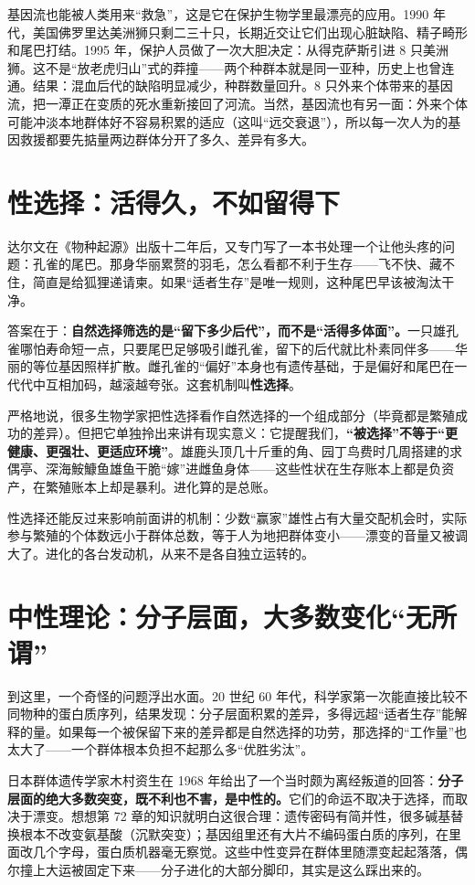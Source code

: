 基因流也能被人类用来“救急”，这是它在保护生物学里最漂亮的应用。1990 年代，美国佛罗里达美洲狮只剩二三十只，长期近交让它们出现心脏缺陷、精子畸形和尾巴打结。1995 年，保护人员做了一次大胆决定：从得克萨斯引进 8 只美洲狮。这不是“放老虎归山”式的莽撞——两个种群本就是同一亚种，历史上也曾连通。结果：混血后代的缺陷明显减少，种群数量回升。8 只外来个体带来的基因流，把一潭正在变质的死水重新接回了河流。当然，基因流也有另一面：外来个体可能冲淡本地群体好不容易积累的适应（这叫“远交衰退”），所以每一次人为的基因救援都要先掂量两边群体分开了多久、差异有多大。

\section{性选择：活得久，不如留得下}

达尔文在《物种起源》出版十二年后，又专门写了一本书处理一个让他头疼的问题：孔雀的尾巴。那身华丽累赘的羽毛，怎么看都不利于生存——飞不快、藏不住，简直是给狐狸递请柬。如果“适者生存”是唯一规则，这种尾巴早该被淘汰干净。

答案在于：\textbf{自然选择筛选的是“留下多少后代”，而不是“活得多体面”。}一只雄孔雀哪怕寿命短一点，只要尾巴足够吸引雌孔雀，留下的后代就比朴素同伴多——华丽的等位基因照样扩散。雌孔雀的“偏好”本身也有遗传基础，于是偏好和尾巴在一代代中互相加码，越滚越夸张。这套机制叫\textbf{性选择}。

严格地说，很多生物学家把性选择看作自然选择的一个组成部分（毕竟都是繁殖成功的差异）。但把它单独拎出来讲有现实意义：它提醒我们，\textbf{“被选择”不等于“更健康、更强壮、更适应环境”}。雄鹿头顶几十斤重的角、园丁鸟费时几周搭建的求偶亭、深海鮟鱇鱼雄鱼干脆“嫁”进雌鱼身体——这些性状在生存账本上都是负资产，在繁殖账本上却是暴利。进化算的是总账。

性选择还能反过来影响前面讲的机制：少数“赢家”雄性占有大量交配机会时，实际参与繁殖的个体数远小于群体总数，等于人为地把群体变小——漂变的音量又被调大了。进化的各台发动机，从来不是各自独立运转的。

\section{中性理论：分子层面，大多数变化“无所谓”}

到这里，一个奇怪的问题浮出水面。20 世纪 60 年代，科学家第一次能直接比较不同物种的蛋白质序列，结果发现：分子层面积累的差异，多得远超“适者生存”能解释的量。如果每一个被保留下来的差异都是自然选择的功劳，那选择的“工作量”也太大了——一个群体根本负担不起那么多“优胜劣汰”。

日本群体遗传学家木村资生在 1968 年给出了一个当时颇为离经叛道的回答：\textbf{分子层面的绝大多数突变，既不利也不害，是中性的。}它们的命运不取决于选择，而取决于漂变。想想第 72 章的知识就明白这很合理：遗传密码有简并性，很多碱基替换根本不改变氨基酸（沉默突变）；基因组里还有大片不编码蛋白质的序列，在里面改几个字母，蛋白质机器毫无察觉。这些中性变异在群体里随漂变起起落落，偶尔撞上大运被固定下来——分子进化的大部分脚印，其实是这么踩出来的。

